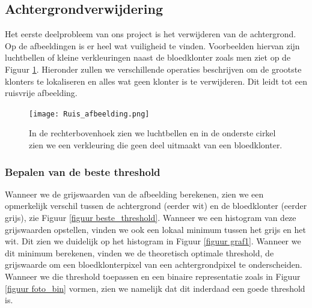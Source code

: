 \documentclass[a4paper,kulak]{kulakarticle}
\begin{document}
		\subsection{Achtergrondverwijdering}
			Het eerste deelprobleem van ons project is het verwijderen van de achtergrond. Op de afbeeldingen is er heel wat vuiligheid te vinden. Voorbeelden hiervan zijn luchtbellen of kleine verkleuringen naast de bloedklonter zoals men ziet op de Figuur \ref{figuur achtergrondverwijdering}. Hieronder zullen we verschillende operaties beschrijven om de grootste klonters te lokaliseren en alles wat geen klonter is te verwijderen. Dit leidt tot een ruisvrije afbeelding.

		\begin{figure}[H]
			\centering
			\texttt{[image: Ruis\_afbeelding.png]}	
			\caption{In de rechterbovenhoek zien we luchtbellen en in de onderste cirkel zien we een verkleuring die geen deel uitmaakt van een bloedklonter.}
			\label{figuur achtergrondverwijdering}
		\end{figure}

	\subsubsection{Bepalen van de beste threshold}
		Wanneer we de grijswaarden van de afbeelding berekenen, zien we een opmerkelijk verschil tussen de achtergrond (eerder wit) en de bloedklonter (eerder grijs),  zie Figuur \ref{figuur beste_threshold}. Wanneer we een histogram van deze grijswaarden opstellen, vinden we ook een lokaal minimum tussen het grijs en het wit. Dit zien we duidelijk op het histogram in Figuur \ref{figuur graf1}. Wanneer we dit minimum berekenen, vinden we de theoretisch optimale threshold, de grijswaarde om een bloedklonterpixel van een achtergrondpixel te onderscheiden. Wanneer we die threshold toepassen en een binaire representatie zoals in Figuur \ref{figuur foto_bin} vormen, zien we namelijk dat dit inderdaad een goede threshold is.
\end{document}
